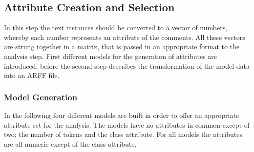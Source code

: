 \documentclass[article,type=msc,colorback,accentcolor=tud7b]{tudthesis}
\begin{document}
  \subsection{Attribute Creation and Selection}
    In this step the text instances should be converted to a vector of numbers, whereby each number represents an attribute of the comments. All these vectors are strung together in a matrix, that is passed in an appropriate format to the analysis step. First different models for the generation of attributes are introduced, before the second step describes the transformation of the model data into an ARFF file.
      
  \subsubsection{Model Generation}
In the following four different models are built in order to offer an appropriate attribute set for the analysis. The models have no attributes in common except of two; the number of tokens and the class attribute. For all models the attributes are all numeric except of the class attribute.
\end{document}
